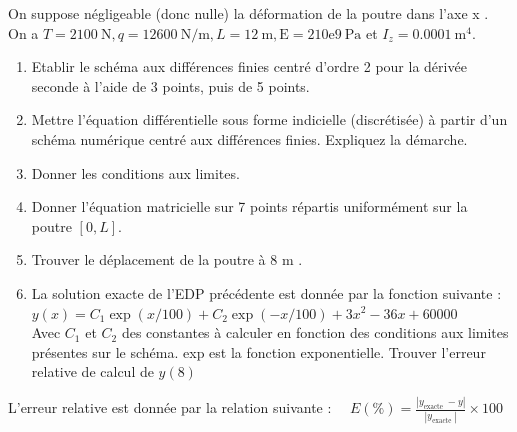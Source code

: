 \documentclass[10pt]{article}
\begin{document}
On suppose négligeable (donc nulle) la déformation de la poutre dans l'axe x .\\
On a \(T=2100 \mathrm{~N}, q=12600 \mathrm{~N} / \mathrm{m}, L=12 \mathrm{~m}, \mathrm{E}=210 \mathrm{e} 9 \mathrm{~Pa}\) et \(I_{z}=0.0001 \mathrm{~m}^{4}\).

\begin{enumerate}
  \item Etablir le schéma aux différences finies centré d'ordre 2 pour la dérivée seconde à l'aide de 3 points, puis de 5 points.
  \item Mettre l'équation différentielle sous forme indicielle (discrétisée) à partir d'un schéma numérique centré aux différences finies. Expliquez la démarche.
  \item Donner les conditions aux limites.
  \item Donner l'équation matricielle sur 7 points répartis uniformément sur la poutre \([0, L]\).
  \item Trouver le déplacement de la poutre à 8 m .
  \item La solution exacte de l'EDP précédente est donnée par la fonction suivante :\\
\(y(x)=C_{1} \exp (x / 100)+C_{2} \exp (-x / 100)+3 x^{2}-36 x+60000\)\\
Avec \(C_{1}\) et \(C_{2}\) des constantes à calculer en fonction des conditions aux limites présentes sur le schéma. exp est la fonction exponentielle. Trouver l'erreur relative de calcul de \(y(8)\)
\end{enumerate}

L'erreur relative est donnée par la relation suivante : \(\quad E(\%)=\frac{\left|y_{\text {exacte }}-y\right|}{\left|y_{\text {exacte }}\right|} \times 100\)
\end{document}
